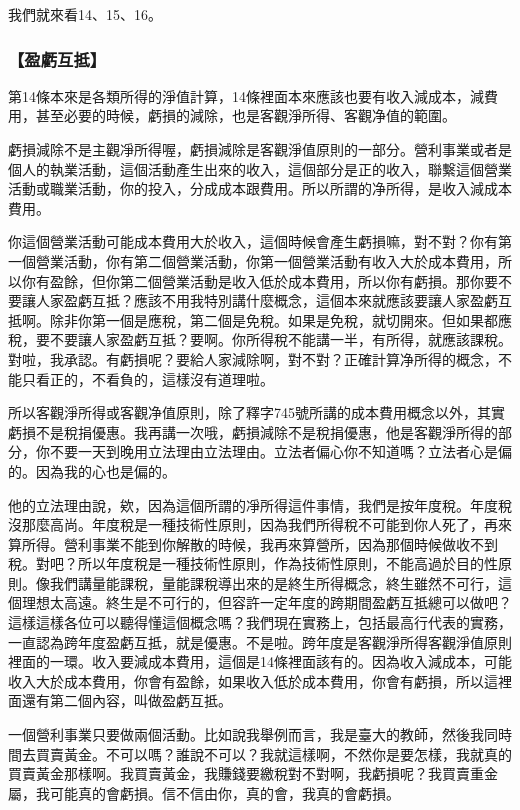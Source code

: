 \documentclass[oneside,sub3section]{ctexbook}
\begin{document}
我們就來看14、15、16。

\hypertarget{ux76c8ux8667ux4e92ux62b5}{%
\subsubsection{【盈虧互抵】}\label{ux76c8ux8667ux4e92ux62b5}}

第14條本來是各類所得的淨值計算，14條裡面本來應該也要有收入減成本，減費用，甚至必要的時候，虧損的減除，也是客觀淨所得、客觀净值的範圍。

虧損減除不是主觀凈所得喔，虧損減除是客觀淨值原則的一部分。營利事業或者是個人的執業活動，這個活動產生出來的收入，這個部分是正的收入，聯繫這個營業活動或職業活動，你的投入，分成成本跟費用。所以所謂的净所得，是收入減成本費用。

你這個營業活動可能成本費用大於收入，這個時候會產生虧損嘛，對不對？你有第一個營業活動，你有第二個營業活動，你第一個營業活動有收入大於成本費用，所以你有盈餘，但你第二個營業活動是收入低於成本費用，所以你有虧損。那你要不要讓人家盈虧互抵？應該不用我特別講什麼概念，這個本來就應該要讓人家盈虧互抵啊。除非你第一個是應稅，第二個是免稅。如果是免稅，就切開來。但如果都應稅，要不要讓人家盈虧互抵？要啊。你所得稅不能講一半，有所得，就應該課稅。對啦，我承認。有虧損呢？要給人家減除啊，對不對？正確計算净所得的概念，不能只看正的，不看負的，這樣沒有道理啦。

所以客觀淨所得或客觀净值原則，除了釋字745號所講的成本費用概念以外，其實虧損不是稅捐優惠。我再講一次哦，虧損減除不是稅捐優惠，他是客觀淨所得的部分，你不要一天到晚用立法理由立法理由。立法者偏心你不知道嗎？立法者心是偏的。因為我的心也是偏的。

他的立法理由說，欸，因為這個所謂的凈所得這件事情，我們是按年度稅。年度稅沒那麼高尚。年度稅是一種技術性原則，因為我們所得稅不可能到你人死了，再來算所得。營利事業不能到你解散的時候，我再來算營所，因為那個時候做收不到稅。對吧？所以年度稅是一種技術性原則，作為技術性原則，不能高過於目的性原則。像我們講量能課稅，量能課稅導出來的是終生所得概念，終生雖然不可行，這個理想太高遠。終生是不可行的，但容許一定年度的跨期間盈虧互抵總可以做吧？這樣這樣各位可以聽得懂這個概念嗎？我們現在實務上，包括最高行代表的實務，一直認為跨年度盈虧互抵，就是優惠。不是啦。跨年度是客觀淨所得客觀淨值原則裡面的一環。收入要減成本費用，這個是14條裡面該有的。因為收入減成本，可能收入大於成本費用，你會有盈餘，如果收入低於成本費用，你會有虧損，所以這裡面還有第二個內容，叫做盈虧互抵。

一個營利事業只要做兩個活動。比如說我舉例而言，我是臺大的教師，然後我同時間去買賣黃金。不可以嗎？誰說不可以？我就這樣啊，不然你是要怎樣，我就真的買賣黃金那樣啊。我買賣黃金，我賺錢要繳稅對不對啊，我虧損呢？我買賣重金屬，我可能真的會虧損。信不信由你，真的會，我真的會虧損。
\end{document}
